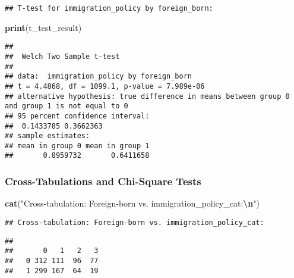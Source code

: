 \documentclass[
]{article}
\newenvironment{Shaded}{\begin{snugshade}}{\end{snugshade}}
\newcommand{\FunctionTok}[1]{\textcolor[rgb]{0.13,0.29,0.53}{\textbf{#1}}}
\newcommand{\NormalTok}[1]{#1}
\newcommand{\OtherTok}[1]{\textcolor[rgb]{0.56,0.35,0.01}{#1}}
\newcommand{\SpecialCharTok}[1]{\textcolor[rgb]{0.81,0.36,0.00}{\textbf{#1}}}
\newcommand{\StringTok}[1]{\textcolor[rgb]{0.31,0.60,0.02}{#1}}
\begin{document}
\begin{verbatim}
## T-test for immigration_policy by foreign_born:
\end{verbatim}

\begin{Shaded}
\begin{Highlighting}[]
\FunctionTok{print}\NormalTok{(t\_test\_result)}
\end{Highlighting}
\end{Shaded}

\begin{verbatim}
## 
##  Welch Two Sample t-test
## 
## data:  immigration_policy by foreign_born
## t = 4.4868, df = 1099.1, p-value = 7.989e-06
## alternative hypothesis: true difference in means between group 0 and group 1 is not equal to 0
## 95 percent confidence interval:
##  0.1433785 0.3662363
## sample estimates:
## mean in group 0 mean in group 1 
##       0.8959732       0.6411658
\end{verbatim}

\subsubsection{Cross-Tabulations and Chi-Square
Tests}\label{cross-tabulations-and-chi-square-tests}

\begin{Shaded}
\begin{Highlighting}[]
\FunctionTok{cat}\NormalTok{(}\StringTok{"Cross{-}tabulation: Foreign{-}born vs. immigration\_policy\_cat:}\SpecialCharTok{\textbackslash{}n}\StringTok{"}\NormalTok{)}
\end{Highlighting}
\end{Shaded}

\begin{verbatim}
## Cross-tabulation: Foreign-born vs. immigration_policy_cat:
\end{verbatim}

\begin{Shaded}
\end{Shaded}

\begin{verbatim}
##    
##       0   1   2   3
##   0 312 111  96  77
##   1 299 167  64  19
\end{verbatim}
\end{document}
